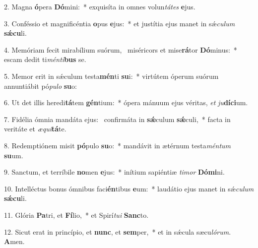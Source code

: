 2. Magna \textbf{ó}pera \textbf{Dó}mini:~*  exquisíta in omnes volun\textit{tá}\textit{tes} \textbf{e}jus.\

3. Conféssio et magnificéntia \textbf{o}pus \textbf{e}jus:~*  et justítia ejus manet in sǽ\textit{cu}\textit{lum} \textbf{sǽ}\textbf{cu}li.\

4. Memóriam fecit mirabílium suórum, \dag\  miséricors et mise\textbf{rá}tor \textbf{Dó}minus:~*  escam dedit ti\textit{mén}\textit{ti}\textbf{bus} se.\

5. Memor erit in sǽculum testa\textbf{mén}ti \textbf{su}i:~*  virtútem óperum suórum annuntiábit pó\textit{pu}\textit{lo} \textbf{su}o:\

6. Ut det illis heredi\textbf{tá}tem \textbf{gén}tium:~*  ópera mánuum ejus véritas, \textit{et} \textit{ju}\textbf{dí}\textbf{ci}um.\

7. Fidélia ómnia mandáta ejus: \dag\  confirmáta in \textbf{sǽ}culum \textbf{sǽ}culi,~*  facta in veritáte et \textit{æ}\textit{qui}\textbf{tá}te.\

8. Redemptiónem misit \textbf{pó}pulo \textbf{su}o:~*  mandávit in ætérnum testa\textit{mén}\textit{tum} \textbf{su}um.\

9. Sanctum, et terríbile \textbf{no}men \textbf{e}jus:~*  inítium sapiéntiæ \textit{ti}\textit{mor} \textbf{Dó}\textbf{mi}ni.\

10. Intelléctus bonus ómnibus faci\textbf{én}tibus \textbf{e}um:~*  laudátio ejus manet in sǽ\textit{cu}\textit{lum} \textbf{sǽ}\textbf{cu}li.\

11. Glória \textbf{Pa}tri, et \textbf{Fí}lio,~*  et Spirí\textit{tu}\textit{i} \textbf{Sanc}to.\

12. Sicut erat in princípio, et \textbf{nunc}, et \textbf{sem}per,~*  et in sǽcula sæcu\textit{ló}\textit{rum}. \textbf{A}men.\

